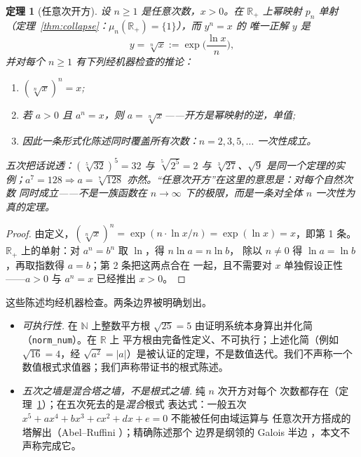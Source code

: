 \documentclass[submission,noinfoline]{jsfds}
\newtheorem{theorem}{定理}
\newcommand{\Lean}[1]{}
\newcommand{\abs}[1]{\lvert #1\rvert}
\begin{document}
\begin{theorem}[任意次开方]\label{thm:anydegree}
设 $n\ge 1$ 是任意次数，$x>0$。在 $\mathbb R_+$ 上幂映射 $p_n$ 单射
（定理~\ref{thm:collapse}：$\mu_n(\mathbb R_+)=\{1\}$），而 $y^n=x$ 的
唯一正解 $y$ 是
\begin{equation}\label{eq:anyroot}
y=\sqrt[n]{x}:=\exp\!\Big(\frac{\ln x}{n}\Big),
\end{equation}
并对每个 $n\ge 1$ 有下列经机器检查的推论：
\begin{enumerate}
\item $(\sqrt[n]{x})^n=x$;
\item 若 $a>0$ 且 $a^n=x$，则 $a=\sqrt[n]{x}$——开方是幂映射的逆，单值;
\item 因此一条形式化陈述同时覆盖所有次数：$n=2,3,5,\dots$ 一次性成立。
\end{enumerate}
五次把话说透：$(\sqrt[5]{32})^5=32$ 与 $\sqrt[5]{2^5}=2$ 与
$\sqrt[3]{27}$、$\sqrt{9}$ 是同一个定理的实例；$a^7=128 \Rightarrow
a=\sqrt[7]{128}$ 亦然。``任意次开方''在这里的意思是：对每个自然次数
同时成立——不是一族函数在 $n\to\infty$ 下的极限，而是一条对全体 $n$
一次性为真的定理。
\end{theorem}
\begin{proof}
由定义，$(\sqrt[n]{x})^n=\exp(n\cdot\ln x/n)=\exp(\ln x)=x$，即第 1 条。
$\mathbb R_+$ 上的单射：对 $a^n=b^n$ 取 $\ln$，得 $n\ln a=n\ln b$，
除以 $n\ne0$ 得 $\ln a=\ln b$，再取指数得 $a=b$；第 2 条把这两点合在
一起，且不需要对 $x$ 单独假设正性——$a>0$ 与 $a^n=x$ 已经推出 $x>0$。
\Lean{nthrootR\_pow, pow\_inj\_on\_Rpos, nthrootR\_eq\_of\_pow}
\end{proof}

这些陈述均经机器检查。两条边界被明确划出。

\begin{itemize}
\item \emph{可执行性.} 在 $\mathbb N$ 上整数平方根 $\sqrt{25}=5$
由证明系统本身算出并化简（\texttt{norm\_num}）。在 $\mathbb R$ 上
平方根由完备性定义、不可执行；上述化简（例如 $\sqrt{16}=4$，经
$\sqrt{a^2}=\abs a$）是被认证的定理，不是数值迭代。我们不声称一个
数值根式求值器；我们声称带证书的根式陈述。
\item \emph{五次之墙是混合塔之墙，不是根式之墙.} 纯 $n$ 次开方对每个
次数都存在（定理~\ref{thm:anydegree}）；在五次死去的是\emph{混合}根式
表达式：一般五次 $x^5+ax^4+bx^3+cx^2+dx+e=0$ 不能被任何由域运算与
任意次开方搭成的塔解出（Abel--Ruffini \citep{Abel1824}）；精确陈述那个
边界是纲领的 Galois 半边 \citep{Galois1846}，本文不声称完成它。
\end{itemize}
\end{document}
